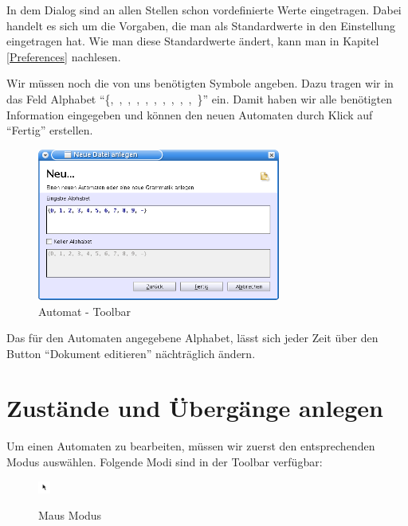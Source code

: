 In dem Dialog sind an allen Stellen schon vordefinierte Werte eingetragen. Dabei
handelt es sich um die Vorgaben, die man als Standardwerte in den Einstellung
eingetragen hat. Wie man diese Standardwerte ändert, kann man in Kapitel
\ref{Preferences} nachlesen.\vspace{10pt}

Wir müssen noch die von uns benötigten Symbole angeben. Dazu tragen wir in das
Feld Alphabet "`\{,\ ,\ ,\ ,\
,\ ,\ ,\ ,\ ,\ ,\
\Symbol{-}\}"' ein. Damit haben wir alle benötigten Information eingegeben und
können den neuen Automaten durch Klick auf "`Fertig"' erstellen.\vspace{10pt}
\vspace{10pt} 

\begin{figure}[h]
\begin{center}
\includegraphics[width=8cm]{../images/new_dialog_machine.png}
\caption{Automat - Toolbar}
\end{center}
\end{figure}

Das für den Automaten angegebene Alphabet, lässt sich jeder Zeit über den Button
"`Dokument editieren"' nächträglich ändern.

\section{Zustände und Übergänge anlegen}

Um einen Automaten zu bearbeiten, müssen wir zuerst den entsprechenden Modus
auswählen. Folgende Modi sind in der Toolbar verfügbar:

\begin{figure}[h!]
  \begin{center}
    \begin{minipage}[t]{1cm}
      \includegraphics[width=0.4cm]{../images/machineToolbar/mouse.png}
    \end{minipage}
    \begin{minipage}[t]{5cm}
      Maus Modus
    \end{minipage}
  \end{center}
\end{figure} 

